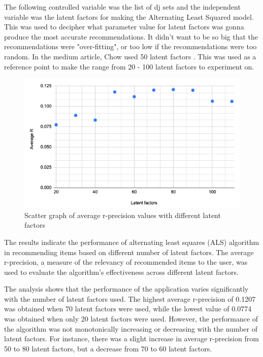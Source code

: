The following controlled variable was the list of dj sets and the independent variable was the latent factors for making the Alternating Least Squared model. This was used to decipher what parameter value for latent factors was gonna produce the most accurate recommendations. It didn't want to be so big that the recommendations were "over-fitting", or too low if the recommendations were too random. In the medium article, Chow used 50 latent factors \citep{chow_music_2020}. This was used as a reference point to make the range from 20 - 100 latent factors to experiment on.
\begin{figure}[H]
	\includegraphics[scale=0.6]{images/average_r_over_latent}
	\centering
	\caption{Scatter graph of average r-precision values with different latent factors} 
\end{figure}

The results indicate the performance of alternating least squares (ALS) algorithm in recommending items based on different number of latent factors. The average r-precision, a measure of the relevancy of recommended items to the user, was used to evaluate the algorithm's effectiveness across different latent factors.

The analysis shows that the performance of the application varies significantly with the number of latent factors used. The highest average r-precision of 0.1207 was obtained when 70 latent factors were used, while the lowest value of 0.0774 was obtained when only 20 latent factors were used. However, the performance of the algorithm was not monotonically increasing or decreasing with the number of latent factors. For instance, there was a slight increase in average r-precision from 50 to 80 latent factors, but a decrease from 70 to 60 latent factors.

